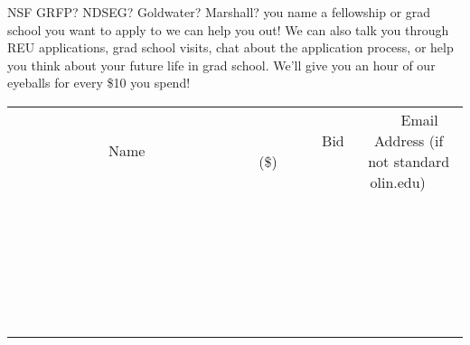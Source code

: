\documentclass[11pt]{article}
\begin{document}
NSF GRFP? NDSEG? Goldwater? Marshall? you name a fellowship or grad school you want to apply to we can help you out! We can also talk you through REU applications, grad school visits, chat about the application process, or help you think about your future life in grad school. We’ll give you an hour of our eyeballs for every \$10 you spend!
\\[6ex]
\begin{tabular}{c c c}
~~~~~~~~~~~~~Name~~~~~~~~~~~~~ & ~~~~~~~~~Bid (\$)~~~~~~~~~  & ~~~Email Address (if not standard olin.edu)~~~\\
 & & \\
\hline
 & & \\
\hline
 & & \\
\hline
 & & \\
\hline
 & & \\
\hline
 & & \\
\hline
 & & \\
\hline
 & & \\
\hline
 & & \\
\hline
 & & \\
\hline
 & & \\
\hline
 & & \\
\hline
 & & \\
\hline
 & & \\
\hline
 & & \\
\hline
 & & \\
\hline
 & & \\
\hline
 & & \\
\hline
 & & \\
\hline
 & & \\
\hline
 & & \\
\hline
 & & \\
\hline
 & & \\
\hline
 & & \\
\hline
 & & \\
\hline
 & & \\
\hline
\end{tabular}
\newpage
\end{document}
